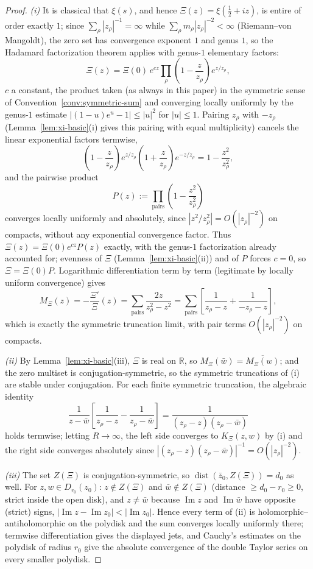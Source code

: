 \documentclass[11pt]{amsart}
\theoremstyle{definition}
\theoremstyle{remark}
\theoremstyle{definition}
\renewcommand{\Im}{\operatorname{Im}}
\newcommand{\half}{\tfrac{1}{2}}
\newcommand{\R}{\mathbb{R}}
\begin{document}
\begin{proof}
\emph{(i)}  It is classical \cite[Ch.~II]{Titchmarsh} that $\xi(s)$, and hence $\Xi(z)=\xi(\half+iz)$, is
entire of order exactly $1$; since $\sum_\rho|z_\rho|^{-1}=\infty$ while
$\sum_\rho m_\rho|z_\rho|^{-2}<\infty$ (Riemann--von Mangoldt), the zero set has convergence exponent
$1$ and genus $1$, so the Hadamard factorization theorem applies with genus-$1$ elementary factors:
\[
   \Xi(z)=\Xi(0)\,e^{cz}\prod_\rho\left(1-\frac z{z_\rho}\right)e^{z/z_\rho},
\]
$c$ a constant, the product taken (as always in this paper) in the symmetric sense of
Convention~\ref{conv:symmetric-sum} and converging locally uniformly by the genus-$1$ estimate
$|(1-u)e^u-1|\le|u|^2$ for $|u|\le1$.  Pairing $z_\rho$ with $-z_\rho$ (Lemma~\ref{lem:xi-basic}(i) gives
this pairing with equal multiplicity) cancels the linear exponential factors termwise,
\[
   \left(1-\frac z{z_\rho}\right)e^{z/z_\rho}\left(1+\frac z{z_\rho}\right)e^{-z/z_\rho}
   =1-\frac{z^2}{z_\rho^2},
\]
and the pairwise product
\[
   P(z):=\prod_{\text{pairs}}\left(1-\frac{z^2}{z_\rho^2}\right)
\]
converges locally uniformly and absolutely, since $|z^2/z_\rho^2|=O(|z_\rho|^{-2})$ on compacts, without
any exponential convergence factor.  Thus $\Xi(z)=\Xi(0)e^{cz}P(z)$ exactly, with the genus-$1$
factorization already accounted for; evenness of $\Xi$ (Lemma~\ref{lem:xi-basic}(ii)) and of $P$ forces
$c=0$, so $\Xi=\Xi(0)P$.  Logarithmic
differentiation term by term (legitimate by locally uniform convergence) gives
\[
   M_\Xi(z)=-\frac{\Xi'}{\Xi}(z)
   =\sum_{\text{pairs}}\frac{2z}{z_\rho^2-z^2}
   =\sum_{\text{pairs}}\left[\frac1{z_\rho-z}+\frac1{-z_\rho-z}\right],
\]
which is exactly the symmetric truncation limit, with pair terms $O(|z_\rho|^{-2})$ on compacts.

\emph{(ii)}  By Lemma~\ref{lem:xi-basic}(iii), $\Xi$ is real on $\R$, so
$M_\Xi(\bar w)=\overline{M_\Xi(w)}$; and the zero multiset is conjugation-symmetric, so the symmetric
truncations of (i) are stable under conjugation.  For each finite symmetric truncation, the algebraic
identity
\[
   \frac1{z-\bar w}\left[\frac1{z_\rho-z}-\frac1{z_\rho-\bar w}\right]
   =
   \frac1{(z_\rho-z)(z_\rho-\bar w)}
\]
holds termwise; letting $R\to\infty$, the left side converges to $K_\Xi(z,w)$ by (i) and the right side
converges absolutely since $|(z_\rho-z)(z_\rho-\bar w)|^{-1}=O(|z_\rho|^{-2})$.

\emph{(iii)}  The set $Z(\Xi)$ is conjugation-symmetric, so
$\operatorname{dist}(\bar z_0,Z(\Xi))=d_0$ as well.  For $z,w\in D_{r_0}(z_0)$: $z\notin Z(\Xi)$ and
$\bar w\notin Z(\Xi)$ (distance $\ge d_0-r_0\ge0$, strict inside the open disk), and $z\ne\bar w$
because $\Im z$ and $\Im\bar w$ have opposite (strict) signs, $|\Im z-\Im z_0|<|\Im z_0|$.  Hence every
term of (ii) is holomorphic--antiholomorphic on the polydisk and the sum converges locally uniformly
there; termwise differentiation gives the displayed jets, and Cauchy's estimates on the polydisk of
radius $r_0$ give the absolute convergence of the double Taylor series on every smaller polydisk.


\end{proof}
\end{document}
